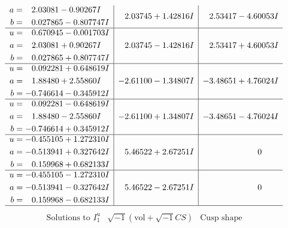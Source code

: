 \documentclass[1p]{elsarticle_modified}
\theoremstyle{definition}
\newcommand{\I}{\sqrt{-1}}
\begin{document}
$$\begin{array}{c|c|c}
\begin{aligned}
a &= \phantom{-}2.03081 - 0.90267 I \\
b &= \phantom{-}0.027865 - 0.807747 I\end{aligned}
 & \phantom{-}2.03745 + 1.42816 I & \phantom{-}2.53417 - 4.60053 I \\ \hline\begin{aligned}
u &= \phantom{-}0.670945 - 0.001703 I \\
a &= \phantom{-}2.03081 + 0.90267 I \\
b &= \phantom{-}0.027865 + 0.807747 I\end{aligned}
 & \phantom{-}2.03745 - 1.42816 I & \phantom{-}2.53417 + 4.60053 I \\ \hline\begin{aligned}
u &= \phantom{-}0.092281 + 0.648619 I \\
a &= \phantom{-}1.88480 + 2.55860 I \\
b &= -0.746614 - 0.345912 I\end{aligned}
 & -2.61100 - 1.34807 I & -3.48651 + 4.76024 I \\ \hline\begin{aligned}
u &= \phantom{-}0.092281 - 0.648619 I \\
a &= \phantom{-}1.88480 - 2.55860 I \\
b &= -0.746614 + 0.345912 I\end{aligned}
 & -2.61100 + 1.34807 I & -3.48651 - 4.76024 I \\ \hline\begin{aligned}
u &= -0.455105 + 1.272310 I \\
a &= -0.513941 + 0.327642 I \\
b &= \phantom{-}0.159968 + 0.682133 I\end{aligned}
 & \phantom{-}5.46522 + 2.67251 I & \phantom{-0.000000 } 0 \\ \hline\begin{aligned}
u &= -0.455105 - 1.272310 I \\
a &= -0.513941 - 0.327642 I \\
b &= \phantom{-}0.159968 - 0.682133 I\end{aligned}
 & \phantom{-}5.46522 - 2.67251 I & \phantom{-0.000000 } 0\\
 \hline 
 \end{array}$$\newpage$$\begin{array}{c|c|c}  
\text{Solutions to }I^u_{1}& \I (\text{vol} + \sqrt{-1}CS) & \text{Cusp shape}\\
 \hline 
\begin{aligned}

\end{aligned}
\end{array}$$
\end{document}
